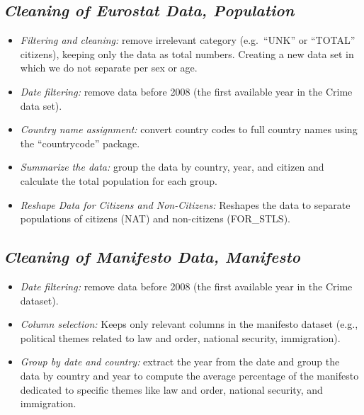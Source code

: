 \documentclass[
]{article}
\begin{document}
\subsection{\texorpdfstring{\emph{Cleaning of Eurostat Data,
Population}}{Cleaning of Eurostat Data, Population}}\label{cleaning-of-eurostat-data-population}

\begin{itemize}
\item
  \emph{Filtering and cleaning:} remove irrelevant category
  (e.g.~``UNK'' or ``TOTAL'' citizens), keeping only the data as total
  numbers. Creating a new data set in which we do not separate per sex
  or age.
\item
  \emph{Date filtering:} remove data before 2008 (the first available
  year in the Crime data set).
\item
  \emph{Country name assignment:} convert country codes to full country
  names using the ``countrycode'' package.
\item
  \emph{Summarize the data:} group the data by country, year, and
  citizen and calculate the total population for each group.
\item
  \emph{Reshape Data for Citizens and Non-Citizens:} Reshapes the data
  to separate populations of citizens (NAT) and non-citizens
  (FOR\_STLS).
\end{itemize}

\subsection{\texorpdfstring{\emph{Cleaning of Manifesto Data,
Manifesto}}{Cleaning of Manifesto Data, Manifesto}}\label{cleaning-of-manifesto-data-manifesto}

\begin{itemize}
\item
  \emph{Date filtering:} remove data before 2008 (the first available
  year in the Crime dataset).
\item
  \emph{Column selection:} Keeps only relevant columns in the manifesto
  dataset (e.g., political themes related to law and order, national
  security, immigration).
\item
  \emph{Group by date and country:} extract the year from the date and
  group the data by country and year to compute the average percentage
  of the manifesto dedicated to specific themes like law and order,
  national security, and immigration.
\end{itemize}
\end{document}
